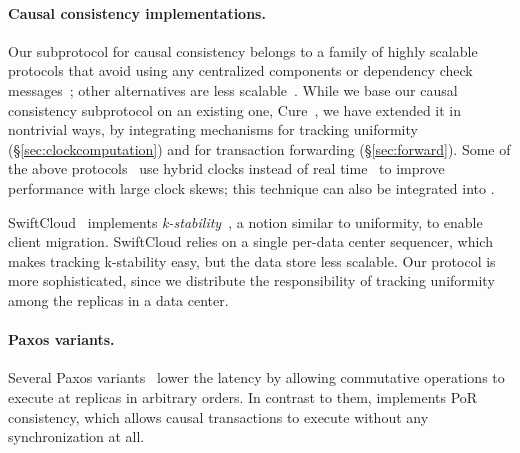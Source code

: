 \paragraph{Causal consistency implementations.}
Our subprotocol for causal consistency belongs to a family of highly scalable
protocols that avoid using any centralized components or dependency check
messages~\cite{gentlerain, cure, wren, paris, pocc}; other alternatives are
less scalable~\cite{cops, eiger, orbe, bolton, chainreaction, swiftcloud,
  saturn, eunomia, occult}. While we base our causal consistency subprotocol on
an existing one, Cure~\cite{cure}, we have extended it in nontrivial ways, by
integrating mechanisms for tracking uniformity (\S\ref{sec:clockcomputation})
and for transaction forwarding (\S\ref{sec:forward}). Some of the above
protocols~\cite{eunomia,paris} use hybrid clocks instead of real time~\cite{hlc}
to improve performance with large clock skews; this technique can also be
integrated into \System.


SwiftCloud~\cite{swiftcloud} implements
\emph{k-stability}~\cite{k-stability}, a notion similar to uniformity,
to enable client migration. SwiftCloud relies on a single per-data
center sequencer, which makes tracking k-stability easy, but the data store
less scalable. Our protocol is more sophisticated, since we distribute the
responsibility of tracking uniformity among the replicas in a data
center.









\paragraph{Paxos variants.}
Several Paxos variants~\cite{generalized,epaxos,atlas,generic} lower the latency
by allowing commutative operations to execute at replicas in arbitrary
orders. In contrast to them, \System implements PoR consistency, which allows
causal transactions to execute without any synchronization at all.






